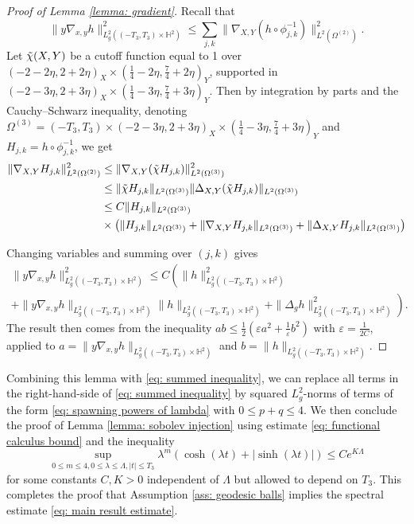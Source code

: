 \documentclass[letterpaper,11pt]{amsart}
\theoremstyle{note}
\numberwithin{equation}{section}
\begin{document}
\begin{proof}[Proof of Lemma \ref{lemma: gradient}]
    Recall that $$\|y\nabla_{x,y} h \|_{L^2_g((-T_3, T_3) \times \mathbb{H}^2)}^2 \leq \sum_{j,k} \|\nabla_{X,Y} (h \circ \phi_{j,k}^{-1})\|_{L^2(\Omega^{(2)})}^2.$$ Let $\Tilde{\chi}(X,Y)$ be a cutoff function equal to 1 over $(-2-2\eta,2+2\eta)_X \times (\frac{1}{4}-2\eta, \frac{7}{4}+ 2\eta)_Y$, supported in $(-2-3\eta,2+3\eta)_X \times (\frac{1}{4}-3\eta, \frac{7}{4}+3\eta)_Y$. Then by integration by parts and the Cauchy--Schwarz inequality, denoting $\Omega^{(3)}=(-T_3,T_3) \times (-2-3\eta,2+3\eta)_X \times (\frac{1}{4}-3\eta, \frac{7}{4}+3\eta)_Y$ and $H_{j,k} = h \circ \phi_{j,k}^{-1}$, we get 
    $$\begin{aligned}
        \|\nabla_{X,Y} H_{j,k}\|_{L^2(\Omega^{(2)})}^2 &\leq \|\nabla_{X,Y} (\Tilde{\chi} H_{j,k})\|_{L^2(\Omega^{(3)})}^2 \\
        &\leq \|\Tilde{\chi} H_{j,k}\|_{L^2(\Omega^{(3)})} \|\Delta_{X,Y} (\Tilde{\chi} H_{j,k})\|_{L^2(\Omega^{(3)})} \\
        &\leq C \|H_{j,k}\|_{L^2(\Omega^{(3)})} \\
        &\times \left(\|H_{j,k}\|_{L^2(\Omega^{(3)})} + \|\nabla_{X,Y} H_{j,k}\|_{L^2(\Omega^{(3)})} + \|\Delta_{X,Y} H_{j,k}\|_{L^2(\Omega^{(3)})}\right)
    \end{aligned}$$

    Changing variables and summing over $(j,k)$ gives \begin{multline}\|y\nabla_{x,y} h \|_{L^2_g((-T_3, T_3) \times \mathbb{H}^2)}^2 \leq C \left( \|h\|_{L^2_g((-T_3, T_3) \times \mathbb{H}^2)}^2 \right.\\ \left.+ \|y\nabla_{x,y}h\|_{L^2_g((-T_3, T_3) \times \mathbb{H}^2)} \|h\|_{L^2_g((-T_3, T_3) \times \mathbb{H}^2)} + \|\Delta_g h\|_{L^2_g((-T_3, T_3) \times \mathbb{H}^2)}^2\right).\end{multline}
    The result then comes from the inequality $ab \leq \frac{1}{2} (\varepsilon a^2 + \frac{1}{\varepsilon} b^2)$ with $\varepsilon = \frac{1}{2C}$, applied to $a = \|y\nabla_{x,y}h\|_{L^2_g((-T_3, T_3) \times \mathbb{H}^2)}$ and $b = \|h\|_{L^2_g((-T_3, T_3) \times \mathbb{H}^2)}$.
\end{proof}

Combining this lemma with \eqref{eq: summed inequality}, we can replace all terms in the right-hand-side of \eqref{eq: summed inequality} by squared $L^2_g$-norms of terms of the form \eqref{eq: spawning powers of lambda} with $0 \leq p+q \leq 4$. We then conclude the proof of Lemma \ref{lemma: sobolev injection} using estimate \eqref{eq: functional calculus bound} and the inequality $$\sup_{0 \leq m \leq 4, 0\leq \lambda \leq \Lambda, |t| \leq T_3} \lambda^m \left(\cosh(\lambda t) + |\sinh(\lambda t)|\right) \leq Ce^{K\Lambda}$$ for some constants $C, K > 0$ independent of $\Lambda$ but allowed to depend on $T_3$. This completes the proof that Assumption \ref{ass: geodesic balls} implies the spectral estimate \eqref{eq: main result estimate}. 
\end{document}
